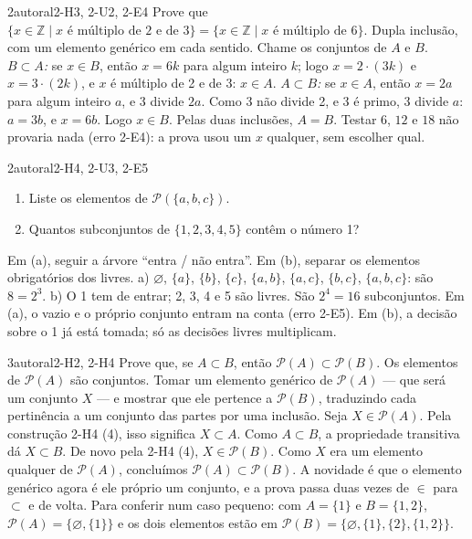 \begin{exemplo}{}{2}{autoral}{2-H3, 2-U2, 2-E4}
\label{ex:u2:multiplos}
Prove que $\{x\in\mathbb{Z}\mid x\text{ é múltiplo de 2 e de 3}\}=\{x\in\mathbb{Z}\mid x\text{ é múltiplo de 6}\}$.
\plano Dupla inclusão, com um elemento genérico em cada sentido.
\resolucao Chame os conjuntos de $A$ e $B$. \emph{$B\subset A$:} se $x\in B$, então $x=6k$ para algum inteiro $k$; logo $x=2\cdot(3k)$ e $x=3\cdot(2k)$, e $x$ é múltiplo de 2 e de 3: $x\in A$. \emph{$A\subset B$:} se $x\in A$, então $x=2a$ para algum inteiro $a$, e 3 divide $2a$. Como 3 não divide 2, e 3 é primo, 3 divide $a$: $a=3b$, e $x=6b$. Logo $x\in B$. Pelas duas inclusões, $A=B$.
\comentario Testar $6$, $12$ e $18$ não provaria nada (erro 2-E4): a prova usou um $x$ qualquer, sem escolher qual.
\end{exemplo}

\begin{exemplo}{}{2}{autoral}{2-H4, 2-U3, 2-E5}
\label{ex:u2:partes}
\begin{enumerate}[label=\alph*)]
  \item Liste os elementos de $\mathcal{P}(\{a,b,c\})$.
  \item Quantos subconjuntos de $\{1,2,3,4,5\}$ contêm o número 1?
\end{enumerate}
\plano Em (a), seguir a árvore \enquote{entra / não entra}. Em (b), separar os elementos obrigatórios dos livres.
\resolucao a) $\varnothing$, $\{a\}$, $\{b\}$, $\{c\}$, $\{a,b\}$, $\{a,c\}$, $\{b,c\}$, $\{a,b,c\}$: são $8=2^3$. b) O 1 tem de entrar; 2, 3, 4 e 5 são livres. São $2^4=16$ subconjuntos.
\comentario Em (a), o vazio e o próprio conjunto entram na conta (erro 2-E5). Em (b), a decisão sobre o 1 já está tomada; só as decisões livres multiplicam.
\end{exemplo}

\begin{exemplo}{}{3}{autoral}{2-H2, 2-H4}
\label{ex:u2:partesAB}
Prove que, se $A\subset B$, então $\mathcal{P}(A)\subset\mathcal{P}(B)$.
\plano Os elementos de $\mathcal{P}(A)$ são conjuntos. Tomar um elemento genérico de $\mathcal{P}(A)$ — que será um conjunto $X$ — e mostrar que ele pertence a $\mathcal{P}(B)$, traduzindo cada pertinência a um conjunto das partes por uma inclusão.
\resolucao Seja $X\in\mathcal{P}(A)$. Pela construção 2-H4 (4), isso significa $X\subset A$. Como $A\subset B$, a propriedade transitiva dá $X\subset B$. De novo pela 2-H4 (4), $X\in\mathcal{P}(B)$. Como $X$ era um elemento qualquer de $\mathcal{P}(A)$, concluímos $\mathcal{P}(A)\subset\mathcal{P}(B)$.
\comentario A novidade é que o elemento genérico agora é ele próprio um conjunto, e a prova passa duas vezes de $\in$ para $\subset$ e de volta. Para conferir num caso pequeno: com $A=\{1\}$ e $B=\{1,2\}$, $\mathcal{P}(A)=\{\varnothing,\{1\}\}$ e os dois elementos estão em $\mathcal{P}(B)=\{\varnothing,\{1\},\{2\},\{1,2\}\}$.
\end{exemplo}

